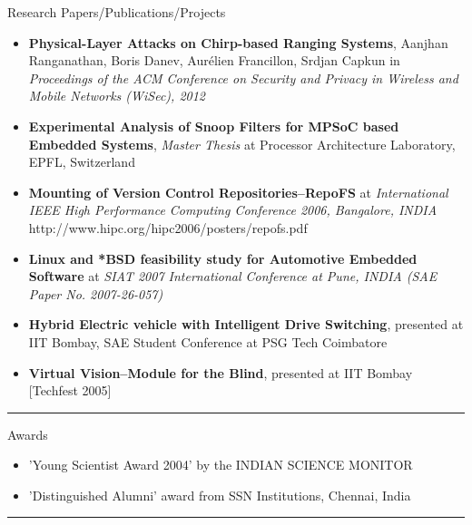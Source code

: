 \documentclass[11pt,oneside]{article}
\newenvironment{ressection}[1]{
	\vspace{4pt}
	{\fontfamily{phv}\selectfont\Large#1}
	\begin{itemize}
	\vspace{3pt}
}{
	\end{itemize}
}
\newcommand{\resitem}[1]{
	\vspace{-4pt}
	\item \begin{flushleft} #1 \end{flushleft}
}
\begin{document}
\begin{ressection}{Research Papers/Publications/Projects}
        \resitem{\textbf{Physical-Layer Attacks on Chirp-based Ranging Systems},
          Aanjhan Ranganathan, Boris Danev, Aur\'elien Francillon, Srdjan
          Capkun in \emph{Proceedings of the ACM Conference on Security and Privacy
          in Wireless and Mobile Networks (WiSec), 2012}}

      \resitem{\textbf{Experimental Analysis of Snoop Filters for MPSoC based
          Embedded Systems}, \emph{Master Thesis} at Processor Architecture
        Laboratory, EPFL, Switzerland}
        
      \resitem{\textbf{Mounting of Version Control Repositories--RepoFS} at
        \emph{International IEEE High Performance Computing Conference 2006,
          Bangalore, INDIA} http://www.hipc.org/hipc2006/posters/repofs.pdf}
    
      \resitem{\textbf{Linux and *BSD feasibility study for Automotive
          Embedded Software} at \emph{SIAT 2007 International Conference at
          Pune, INDIA (SAE Paper No. 2007-26-057)}}

      \resitem{\textbf{Hybrid Electric vehicle with Intelligent Drive
          Switching}, presented at IIT Bombay, SAE Student Conference at PSG
        Tech Coimbatore}

      \resitem{\textbf{Virtual Vision--Module for the Blind}, presented at IIT
        Bombay [Techfest 2005]}
\end{ressection}
\rule{\textwidth}{.5pt}

\begin{ressection}{Awards}
        
        \resitem{'Young Scientist Award 2004' by the INDIAN SCIENCE MONITOR}
        \resitem{'Distinguished Alumni' award from SSN Institutions,
            Chennai, India}

\end{ressection}
\rule{\textwidth}{.5pt}



\end{document}
